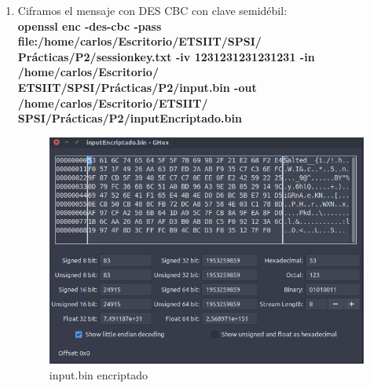 \begin{enumerate}
	\item Ciframos el mensaje con DES CBC con clave semidébil:\\
		\textbf{openssl enc -des-cbc -pass\\ file:/home/carlos/Escritorio/ETSIIT/SPSI/\\Prácticas/P2/sessionkey.txt -iv 1231231231231231 -in /home/carlos/Escritorio/\\ETSIIT/SPSI/Prácticas/P2/input.bin -out /home/carlos/Escritorio/ETSIIT/\\SPSI/Prácticas/P2/inputEncriptado.bin}
		
		\begin{figure}[H] %
			\centering
			\includegraphics[scale=0.55]{imagenes/inputEncriptado} 
			\caption{input.bin encriptado} \label{etiq}
		\end{figure}
\end{enumerate}

\newpage







